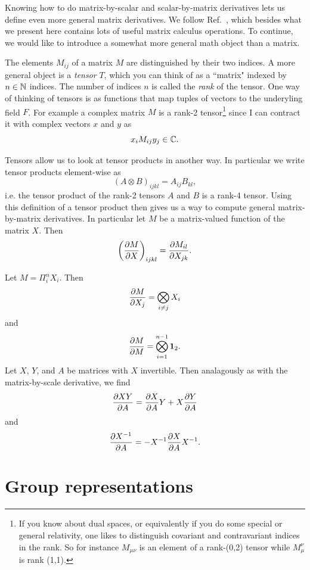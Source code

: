 Knowing how to do matrix-by-scalar and scalar-by-matrix derivatives
lets us define even more general matrix derivatives. 
We follow Ref.~\cite{kamleh_hybrid_2004}, which besides what we present
here contains lots of useful matrix calculus operations.
To continue, we would like
to introduce a somewhat more general math object than a matrix.

The elements $M_{ij}$ of a matrix $M$ are distinguished by their two indices.
A more general object is a {\it tensor} $T$, which you can think
of as a ``matrix" indexed by $n\in\mathbb{N}$ indices. The number of indices $n$
is called the {\it rank} of the tensor. One way of thinking of
tensors is as functions that map tuples of vectors to the underyling field $F$.
For example a complex matrix $M$ is a rank-2 tensor\footnote{If you know about
dual spaces, or equivalently if you do some special or general relativity,
one likes to distinguish covariant and contravariant indices
in the rank. So for instance $M_{\mu\nu}$ is an element of a rank-(0,2)
tensor while $M_\mu^\nu$ is rank (1,1).}
since I can contract it with complex vectors $x$ and $y$ as
\begin{equation}
x_i M_{ij} y_j \in\mathbb{C}.
\end{equation}

Tensors allow us to look at tensor products in another way. In particular
we write tensor products element-wise as
\begin{equation}
\left(A\otimes B\right)_{ijkl}=A_{ij}B_{kl},
\end{equation}
i.e. the tensor product of the rank-2 tensors $A$ and $B$ is a rank-4 tensor.
Using this definition of a tensor product then gives us a way to compute
general matrix-by-matrix derivatives. In
particular let $M$ be a matrix-valued function of the matrix $X$.
Then
\begin{equation}
\left(\pdv{M}{X}\right)_{ijkl}=\pdv{M_{il}}{X_{jk}}.
\end{equation}

\begin{proposition}{}{}
Let $M=\Pi_i^n X_i$. Then
$$ \pdv{M}{X_j}=\bigotimes_{i\neq j}X_i $$
and
$$ \pdv{M}{M}=\bigotimes_{i=1}^{n-1}{\mathbf 1}_2. $$
Let $X$, $Y$, and $A$ be matrices with $X$ invertible. 
Then analagously as with the matrix-by-scale
derivative, we find
$$
\pdv{XY}{A}=\pdv{X}{A}Y+X\pdv{Y}{A}
$$
and
$$
\pdv{X^{-1}}{A}=-X^{-1}\pdv{X}{A}X^{-1}.
$$
\end{proposition}

\section{Group representations}\label{sec:represent}


